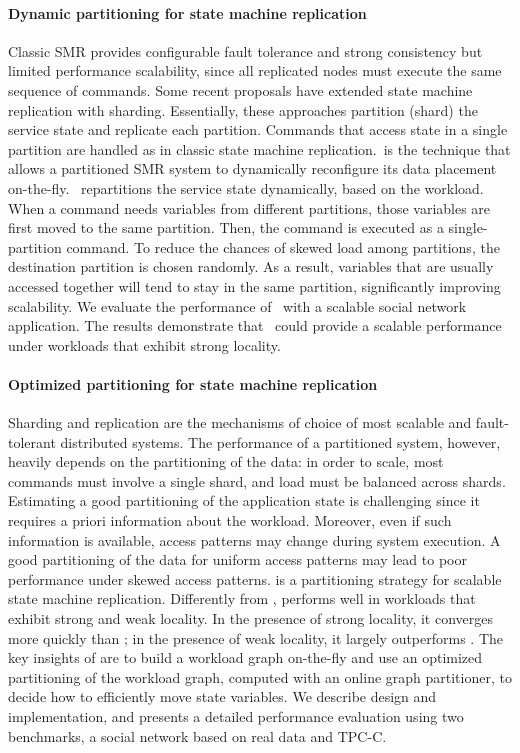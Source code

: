 \paragraph{Dynamic partitioning for state machine replication} 
Classic SMR provides configurable fault tolerance and strong consistency but
limited performance scalability, since all replicated nodes must execute the same
sequence of commands. Some recent proposals have extended state machine
replication with sharding. Essentially, these approaches partition (shard) the
service state and replicate each partition. Commands that access state in a
single partition are handled as in classic state machine replication.\dssmr\ is
the technique that allows a partitioned SMR system to dynamically reconfigure
its data placement on-the-fly. \dssmr\ repartitions the service state
dynamically, based on the workload. When a command needs variables from
different partitions, those variables are first moved to the same partition.
Then, the command is executed as a single-partition command. To reduce the
chances of skewed load among partitions, the destination partition is chosen
randomly. As a result, variables that are usually accessed together will tend to
stay in the same partition, significantly improving scalability. We evaluate the
performance of \dssmr\ with a scalable social network application. The results
demonstrate that \dssmr\ could provide a scalable performance under workloads
that exhibit strong locality.

\paragraph{Optimized partitioning for state machine replication}
Sharding and replication are the mechanisms of choice of most scalable and
fault-tolerant distributed systems. The performance of a partitioned system,
however, heavily depends on the partitioning of the data: in order to scale,
most commands must involve a single shard, and load must be balanced across
shards. Estimating a good partitioning of the application state is challenging
since it requires a priori information about the workload. Moreover, even if
such information is available, access patterns may change during system
execution. A good partitioning of the data for uniform access patterns may lead
to poor performance under skewed access patterns. \dynastar is a partitioning
strategy for scalable state machine replication. Differently from \dssmr{},
\dynastar performs well in workloads that exhibit strong and weak locality. In
the presence of strong locality, it converges more quickly than \dssmr{}; in the
presence of weak locality, it largely outperforms \dssmr{}. The key insights of
\dynastar are to build a workload graph on-the-fly and use an optimized
partitioning of the workload graph, computed with an online graph partitioner,
to decide how to efficiently move state variables. We describe \dynastar design
and implementation, and presents a detailed performance evaluation using two
benchmarks, a social network based on real data and TPC-C.


